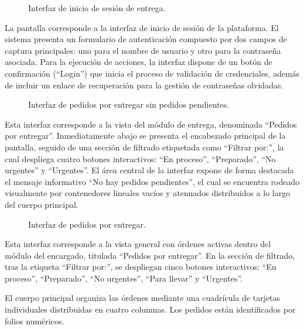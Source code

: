 \begin{figure}[H]
    \centering
    
    \caption{Interfaz de inicio de sesión de entrega.}
    \label{fig:ui-ent-01}
\end{figure}

La pantalla corresponde a la interfaz de inicio de sesión de la plataforma. El sistema presenta un formulario de autenticación compuesto por dos campos de captura principales: uno para el nombre de usuario y otro para la contraseña asociada. Para la ejecución de acciones, la interfaz dispone de un botón de confirmación (``Login'') que inicia el proceso de validación de credenciales, además de incluir un enlace de recuperación para la gestión de contraseñas olvidadas.

\begin{figure}[H]
    \centering
    
    \caption{Interfaz de pedidos por entregar sin pedidos pendientes.}
    \label{fig:ui-ent-02}
\end{figure}

Esta interfaz corresponde a la vista del módulo de entrega, denominada ``Pedidos por entregar''. Inmediatamente abajo se presenta el encabezado principal de la pantalla, seguido de una sección de filtrado etiquetada como ``Filtrar por:'', la cual despliega cuatro botones interactivos: ``En proceso'', ``Preparado'', ``No urgentes'' y ``Urgentes''. El área central de la interfaz expone de forma destacada el mensaje informativo ``No hay pedidos pendientes'', el cual se encuentra rodeado visualmente por contenedores lineales vacíos y atenuados distribuidos a lo largo del cuerpo principal.

\begin{figure}[H]
    \centering
    
    \caption{Interfaz de pedidos por entregar.}
    \label{fig:ui-ent-02-pendientes}
\end{figure}

Esta interfaz corresponde a la vista general con órdenes activas dentro del módulo del encargado, titulada ``Pedidos por entregar''. En la sección de filtrado, tras la etiqueta ``Filtrar por:'', se despliegan cinco botones interactivos: ``En proceso'', ``Preparado'', ``No urgentes'', ``Para llevar'' y ``Urgentes''. 

El cuerpo principal organiza las órdenes mediante una cuadrícula de tarjetas individuales distribuidas en cuatro columnas. Los pedidos están identificados por folios numéricos. 


